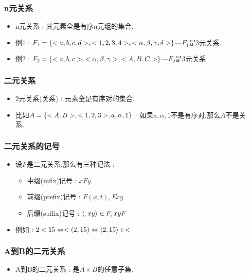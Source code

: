 {{\subsubsection{n元关系}{
  \begin{itemize}
    \item n元关系 : 其元素全是有序n元组的集合.
    \item 例1 : $F_1 = \left\{ <a,b,c,d>,<1,2,3,4>,<\alpha,\beta,\gamma,\delta> \right\}$---$F_1$是3元关系.
    \item 例2 : $F_2 = \left\{ <a,b,c>,<\alpha,\beta,\gamma>,<A,B,C> \right\}$---$F_2$是3元关系
  \end{itemize}
}%

\subsubsection{二元关系}{
  \begin{itemize}
    \item 2元关系(关系) : 元素全是有序对的集合.
    \item 比如$A = \left\{ <A,B>,<1,2,3>,a,\alpha,1 \right\}$---如果$a,\alpha,1$不是有序对,那么$A$不是关系.
  \end{itemize}
}%

\subsubsection{二元关系的记号}{
  \begin{itemize}
    \item{
          设$F$是二元关系,那么有三种记法 :

          \begin{itemize}
            \item 中缀(infix)记号 : $xFy$
            \item 前缀(prefix)记号 : $F(x,t),Fxy$
            \item 后缀(suffix)记号 : $\langle,xy\rangle \in F,xyF$
          \end{itemize}
          }
    \item 例如 : $2 < 15 \Leftrightarrow <(2,15) \Leftrightarrow \langle2,15\rangle \in <$
  \end{itemize}
}%

\subsubsection{A到B的二元关系}{
  \begin{itemize}
    \item {
          A到B的二元关系 : 是$A \times B$的任意子集.

}
\end{itemize}}}}
